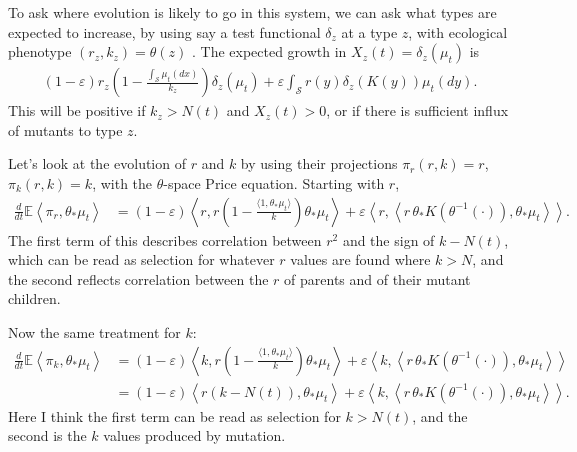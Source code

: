 \documentclass[11pt]{amsart}
\theoremstyle{remark}
\theoremstyle{definition}
\begin{document}
To ask where evolution is likely to go in this system, we can ask what types
are expected to increase, by using say a test functional $\delta_z$
at a type $z$,
with ecological phenotype $(r_z,k_z)=\theta(z)$%
.
The expected growth in $X_z(t)=\delta_z(\mu_t)$ is
\begin{align*}
	(1-\varepsilon) r_z \left( 1 - \frac{\int_{\mathcal{S}} \mu_t(dx)}{k_z} \right) \delta_z(\mu_t) + \varepsilon \int_{\mathcal{S}}  r(y) \delta_z(K(y)) \mu_t(dy).
\end{align*}
This will be positive if $k_z>N(t)$ and $X_z(t)>0$,
or if there is sufficient influx of mutants to type $z$.

Let's look at the evolution of $r$ and $k$ by using their projections
$\pi_r(r,k)=r$, $\pi_k(r,k)=k$, with the $\theta$-space Price equation.
Starting with $r$,
\begin{align*}
	\frac{d}{dt}\mathbb{E}\left\langle \pi_r, \theta_{*}\mu_t \right\rangle
	&= (1-\varepsilon) \left\langle r, r \left( 1 - \frac{\langle 1, \theta_*{\mu_t}\rangle}{k} \right) \theta_*\mu_t \right\rangle 
		+ \varepsilon \left\langle r, \left\langle r\,\theta_*K(\theta^{-1}(\cdot)), \theta_{*}\mu_t \right\rangle \right\rangle.
\end{align*}
The first term of this describes correlation between $r^2$ and the
sign of $k-N(t)$,
which can be read as selection for whatever $r$ values are found where $k>N$,
and the second reflects correlation between the $r$ of 
parents and of their mutant children.

Now the same treatment for $k$:
\begin{align*}
	\frac{d}{dt}\mathbb{E}\left\langle \pi_k, \theta_{*}\mu_t \right\rangle
	&= (1-\varepsilon) \left\langle k, r \left( 1 - \frac{\langle 1, \theta_*{\mu_t}\rangle}{k} \right) \theta_*\mu_t \right\rangle 
		+ \varepsilon \left\langle k, \left\langle r\,\theta_*K(\theta^{-1}(\cdot)), \theta_{*}\mu_t \right\rangle \right\rangle \\
	&= (1-\varepsilon) \left\langle r ( k - N(t) ), \theta_*\mu_t \right\rangle 
		+ \varepsilon \left\langle k, \left\langle r\,\theta_*K(\theta^{-1}(\cdot)), \theta_{*}\mu_t \right\rangle \right\rangle .
\end{align*}
Here I think the first term can be read as selection for $k>N(t)$,
and the second is the $k$ values produced by mutation.
\end{document}

